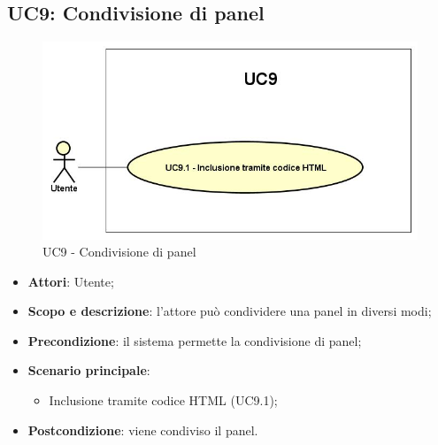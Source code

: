 \subsection{UC9: Condivisione di panel}
\hypertarget{UC9}{}
\begin{figure} [H]
	\centering
	\includegraphics[scale=0.45]{Img/UC9}
	\caption{UC9 - Condivisione di panel}\label{}
\end{figure}
\begin{itemize}
	\item \textbf{Attori}: Utente;
	\item \textbf{Scopo e descrizione}: l'attore può condividere una panel in diversi modi;
	\item \textbf{Precondizione}: il sistema permette la condivisione di panel;
	\item \textbf{Scenario principale}: 
	\begin{itemize}
		\item Inclusione tramite codice HTML (UC9.1);
	\end{itemize}
	\item \textbf{Postcondizione}: viene condiviso il panel.
\end{itemize}



